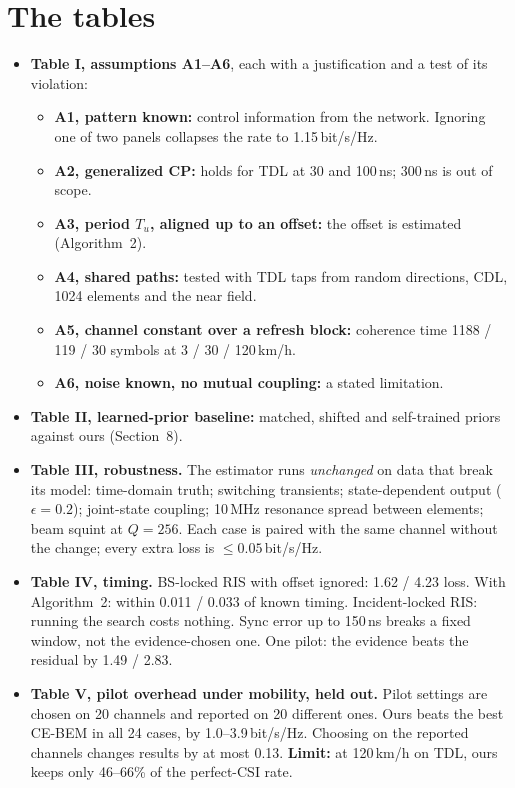 \documentclass[11pt,a4paper]{article}
\begin{document}
\section{The tables}
\begin{itemize}
\item \textbf{Table I, assumptions A1--A6}, each with a justification and a test of its violation:
  \begin{itemize}
  \item \textbf{A1, pattern known:} control information from the network. Ignoring one of two panels collapses the rate
  to 1.15\,bit/s/Hz.
  \item \textbf{A2, generalized CP:} holds for TDL at 30 and 100\,ns; 300\,ns is out of scope.
  \item \textbf{A3, period $T_u$, aligned up to an offset:} the offset is estimated (Algorithm~2).
  \item \textbf{A4, shared paths:} tested with TDL taps from random directions, CDL, 1024 elements and the near field.
  \item \textbf{A5, channel constant over a refresh block:} coherence time 1188 / 119 / 30 symbols at 3 / 30 / 120\,km/h.
  \item \textbf{A6, noise known, no mutual coupling:} a stated limitation.
  \end{itemize}
\item \textbf{Table II, learned-prior baseline:} matched, shifted and self-trained priors against ours (Section~8).
\item \textbf{Table III, robustness.} The estimator runs \emph{unchanged} on data that break its model: time-domain truth;
switching transients; state-dependent output ($\epsilon=0.2$); joint-state coupling; 10\,MHz resonance spread between
elements; beam squint at $Q=256$. Each case is paired with the same channel without the change; every extra loss is
$\le0.05$\,bit/s/Hz.
\item \textbf{Table IV, timing.} BS-locked RIS with offset ignored: 1.62 / 4.23 loss. With Algorithm~2: within 0.011 /
0.033 of known timing. Incident-locked RIS: running the search costs nothing. Sync error up to 150\,ns breaks a fixed window,
not the evidence-chosen one. One pilot: the evidence beats the residual by 1.49 / 2.83.
\item \textbf{Table V, pilot overhead under mobility, held out.} Pilot settings are chosen on 20 channels and reported on
20 different ones. Ours beats the best CE-BEM in all 24 cases, by 1.0--3.9\,bit/s/Hz. Choosing on the reported channels
changes results by at most 0.13. \textbf{Limit:} at 120\,km/h on TDL, ours keeps only 46--66\% of the perfect-CSI rate.
\end{itemize}
\end{document}
